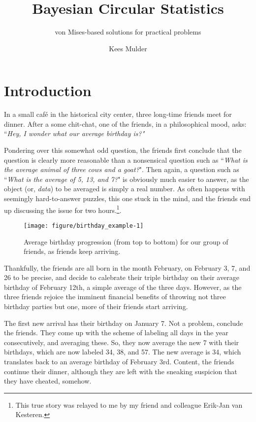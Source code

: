\documentclass[12pt, a4paper]{book}\usepackage[]{graphicx}\usepackage[]{color}
\title{Bayesian Circular Statistics}
\subtitle{von Mises-based solutions for practical problems}
\author{Kees Mulder}
\makeatletter
\def\maxwidth{ %
  \ifdim\Gin@nat@width>\linewidth
    \linewidth
  \else
    \Gin@nat@width
  \fi
}
\newenvironment{knitrout}{}{} %
\makeatother
\begin{document}
\frontmatter

\maketitle

\tableofcontents



\mainmatter
\chapter{Introduction}
\label{intro}

In a small caf\'e in the historical city center, three long-time friends meet for dinner. After a some chit-chat, one of the friends, in a philosophical mood, asks: ``\textit{Hey, I wonder what our average birthday is?"}

Pondering over this somewhat odd question, the friends first conclude that the question is clearly more reasonable than a nonsensical question such as ``\textit{What is the average animal of three cows and a goat?}". Then again, a question such as ``\textit{What is the average of 5, 13, and 7?}" is obviously much easier to answer, as the object (or, \textit{data}) to be averaged is simply a real number. As often happens with seemingly hard-to-answer puzzles, this one stuck in the mind, and the friends end up discussing the issue for two hours.\footnote{This true story was relayed to me by my friend and colleague Erik-Jan van Kesteren.}.


\begin{figure}
\begin{knitrout}
\color{fgcolor}
\texttt{[image: figure/birthday\_example-1]} 

\end{knitrout}
\caption{Average birthday  progression (from top to bottom) for our group of friends, as friends keep arriving.}
\label{birthday_example}
\end{figure}


Thankfully, the friends are all born in the month February, on February 3, 7, and 26 to be precise, and decide to calebrate their triple birthday on their average birthday of February 12th, a simple average of the three days. However, as the three friends rejoice the imminent financial benefits of throwing not three birthday parties but one, more of their friends start arriving.

The first new arrival has their birthday on January 7. Not a problem, conclude the friends. They come up with the scheme of labeling all days in the year consecutively, and averaging these. So, they now average the new 7 with their birthdays, which are now labeled 34, 38, and 57. The new average is 34, which translates back to an average birthday of February 3rd. Content, the friends continue their dinner, although they are left with the sneaking suspicion that they have cheated, somehow.
\end{document}
